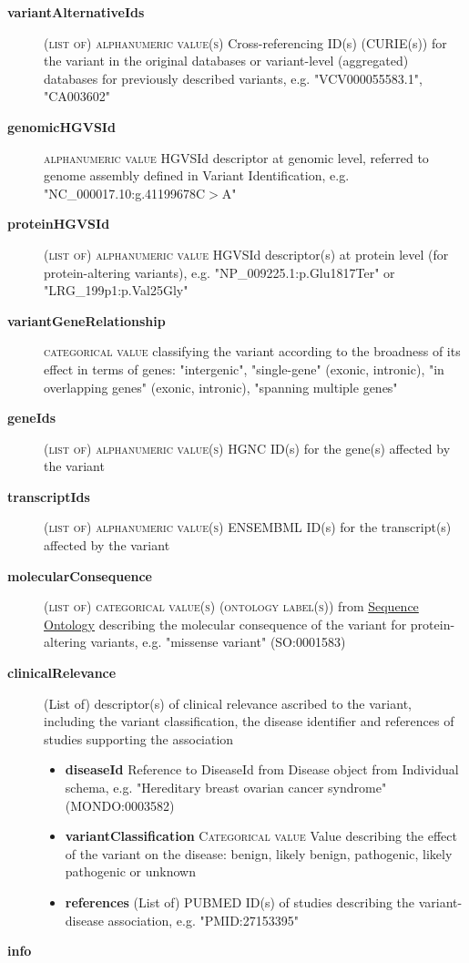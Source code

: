 \documentclass[a4paper, 10pt]{article}        %
\begin{document}
  \begin{description}
	\item[\textbf{variantAlternativeIds}] {\textsc{(list of) alphanumeric value(s)}} Cross-referencing ID(s) (CURIE(s)) for the variant in the original databases or variant-level (aggregated) databases for previously described variants, e.g. "VCV000055583.1", "CA003602"
	\item[\textbf{genomicHGVSId}]  {\textsc{alphanumeric value}} HGVSId descriptor at genomic level, referred to genome assembly defined in Variant Identification, e.g. "NC\_000017.10:g.41199678C$>$A"
	\item[\textbf{proteinHGVSId}] {\textsc{(list of) alphanumeric value}} HGVSId descriptor(s) at protein level (for protein-altering variants), e.g. "NP\_009225.1:p.Glu1817Ter" or "LRG\_199p1:p.Val25Gly"
	\item[\textbf{variantGeneRelationship}] {\textsc{categorical value}} classifying the variant according to the broadness of its effect in terms of genes: "intergenic", "single-gene" (exonic, intronic), "in overlapping genes" (exonic, intronic), "spanning multiple genes"	
		
	\item[\textbf{geneIds}] {\textsc{(list of) alphanumeric value(s)}} HGNC ID(s) for the gene(s) affected by the variant
	\item[\textbf{transcriptIds}] {\textsc{(list of) alphanumeric value(s)}} ENSEMBML ID(s) for the transcript(s) affected by the variant
	\item[\textbf{molecularConsequence}] {\textsc{(list of) categorical value(s) (ontology label(s))}} from \href{http://www.sequenceontology.org}{Sequence Ontology} describing the molecular consequence of the variant for protein-altering variants, e.g. "missense variant" (SO:0001583)
	\item[\textbf{clinicalRelevance}] (List of) descriptor(s) of clinical relevance ascribed to the variant, including the variant classification, the disease identifier and references of studies supporting the association
	        \begin{itemize}
		\item[] \textbf{diseaseId} Reference to DiseaseId from Disease object from Individual schema, e.g. "Hereditary breast ovarian cancer syndrome" (MONDO:0003582)
		\item[] \textbf{variantClassification} {\textsc{Categorical value}} Value describing the effect of the variant on the disease: benign, likely benign, pathogenic, likely pathogenic or unknown
		\item[] \textbf{references} (List of) PUBMED ID(s) of studies describing the variant-disease association, e.g. "PMID:27153395"
                 \end{itemize}
	\item[\textbf{info}] 
 \end{description}
 
\end{document}
